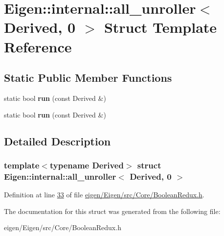 \hypertarget{struct_eigen_1_1internal_1_1all__unroller_3_01_derived_00_010_01_4}{}\section{Eigen\+:\+:internal\+:\+:all\+\_\+unroller$<$ Derived, 0 $>$ Struct Template Reference}
\label{struct_eigen_1_1internal_1_1all__unroller_3_01_derived_00_010_01_4}
\subsection*{Static Public Member Functions}
\begin{DoxyCompactItemize}
\item 
\mbox{\label{struct_eigen_1_1internal_1_1all__unroller_3_01_derived_00_010_01_4_a130d49c75b6aa6c1b97faee7d9a1afc8}} 
static bool {\bfseries run} (const Derived \&)
\item 
\mbox{\label{struct_eigen_1_1internal_1_1all__unroller_3_01_derived_00_010_01_4_a130d49c75b6aa6c1b97faee7d9a1afc8}} 
static bool {\bfseries run} (const Derived \&)
\end{DoxyCompactItemize}


\subsection{Detailed Description}
\subsubsection*{template$<$typename Derived$>$\newline
struct Eigen\+::internal\+::all\+\_\+unroller$<$ Derived, 0 $>$}



Definition at line \hyperlink{eigen_2_eigen_2src_2_core_2_boolean_redux_8h_source_l00033}{33} of file \hyperlink{eigen_2_eigen_2src_2_core_2_boolean_redux_8h_source}{eigen/\+Eigen/src/\+Core/\+Boolean\+Redux.\+h}.



The documentation for this struct was generated from the following file\+:\begin{DoxyCompactItemize}
\item 
eigen/\+Eigen/src/\+Core/\+Boolean\+Redux.\+h\end{DoxyCompactItemize}
